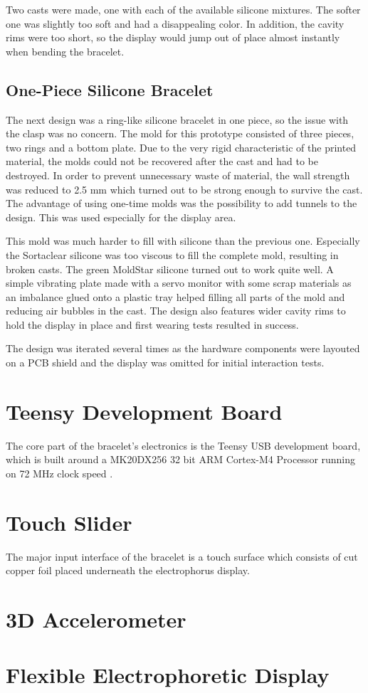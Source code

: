 Two casts were made, one with each of the available silicone mixtures. The softer one was slightly too soft and had a disappealing color. In addition, the cavity rims were too short, so the display would jump out of place almost instantly when bending the bracelet.

\subsection{One-Piece Silicone Bracelet}
The next design was a ring-like silicone bracelet in one piece, so the issue with the clasp was no concern. The mold for this prototype consisted of three pieces, two rings and a bottom plate. Due to the very rigid characteristic of the printed material, the molds could not be recovered after the cast and had to be destroyed. In order to prevent unnecessary waste of material, the wall strength was reduced to 2.5 mm which turned out to be strong enough to survive the cast. The advantage of using one-time molds was the possibility to add tunnels to the design. This was used especially for the display area.

This mold was much harder to fill with silicone than the previous one. Especially the Sortaclear silicone was too viscous to fill the complete mold, resulting in broken casts. The green MoldStar silicone turned out to work quite well. A simple vibrating plate made with a servo monitor with some scrap materials as an imbalance glued onto a plastic tray helped filling all parts of the mold and reducing air bubbles in the cast. The design also features wider cavity rims to hold the display in place and first wearing tests resulted in success.

The design was iterated several times as the hardware components were layouted on a \ac{PCB} shield and the display was omitted for initial interaction tests.

\section{Teensy Development Board}
The core part of the bracelet's electronics is the Teensy USB development board, which is built around a MK20DX256
32 bit ARM Cortex-M4 Processor running on 72 MHz clock speed \cite{teensy_web}.

\section{Touch Slider}
The major input interface of the bracelet is a touch surface which consists of cut copper foil placed underneath the electrophorus display.

\section{3D Accelerometer}

\section{Flexible Electrophoretic Display}